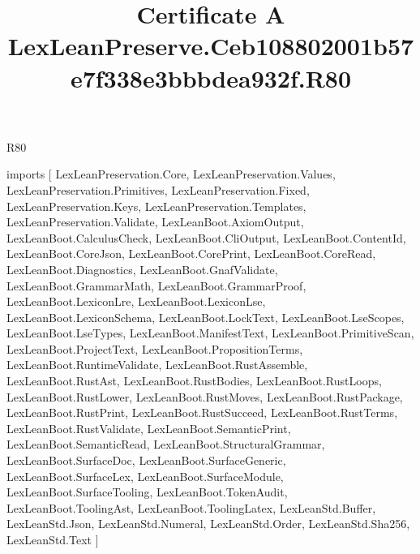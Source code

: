 \begin{lexlean}{R80}
\title{Certificate A LexLeanPreserve.Ceb108802001b57e7f338e3bbbdea932f.R80}
\begin{coremodule}
imports [
  LexLeanPreservation.Core,
  LexLeanPreservation.Values,
  LexLeanPreservation.Primitives,
  LexLeanPreservation.Fixed,
  LexLeanPreservation.Keys,
  LexLeanPreservation.Templates,
  LexLeanPreservation.Validate,
  LexLeanBoot.AxiomOutput,
  LexLeanBoot.CalculusCheck,
  LexLeanBoot.CliOutput,
  LexLeanBoot.ContentId,
  LexLeanBoot.CoreJson,
  LexLeanBoot.CorePrint,
  LexLeanBoot.CoreRead,
  LexLeanBoot.Diagnostics,
  LexLeanBoot.GnafValidate,
  LexLeanBoot.GrammarMath,
  LexLeanBoot.GrammarProof,
  LexLeanBoot.LexiconLre,
  LexLeanBoot.LexiconLse,
  LexLeanBoot.LexiconSchema,
  LexLeanBoot.LockText,
  LexLeanBoot.LseScopes,
  LexLeanBoot.LseTypes,
  LexLeanBoot.ManifestText,
  LexLeanBoot.PrimitiveScan,
  LexLeanBoot.ProjectText,
  LexLeanBoot.PropositionTerms,
  LexLeanBoot.RuntimeValidate,
  LexLeanBoot.RustAssemble,
  LexLeanBoot.RustAst,
  LexLeanBoot.RustBodies,
  LexLeanBoot.RustLoops,
  LexLeanBoot.RustLower,
  LexLeanBoot.RustMoves,
  LexLeanBoot.RustPackage,
  LexLeanBoot.RustPrint,
  LexLeanBoot.RustSucceed,
  LexLeanBoot.RustTerms,
  LexLeanBoot.RustValidate,
  LexLeanBoot.SemanticPrint,
  LexLeanBoot.SemanticRead,
  LexLeanBoot.StructuralGrammar,
  LexLeanBoot.SurfaceDoc,
  LexLeanBoot.SurfaceGeneric,
  LexLeanBoot.SurfaceLex,
  LexLeanBoot.SurfaceModule,
  LexLeanBoot.SurfaceTooling,
  LexLeanBoot.TokenAudit,
  LexLeanBoot.ToolingAst,
  LexLeanBoot.ToolingLatex,
  LexLeanStd.Buffer,
  LexLeanStd.Json,
  LexLeanStd.Numeral,
  LexLeanStd.Order,
  LexLeanStd.Sha256,
  LexLeanStd.Text
]


\end{coremodule}
\end{lexlean}
